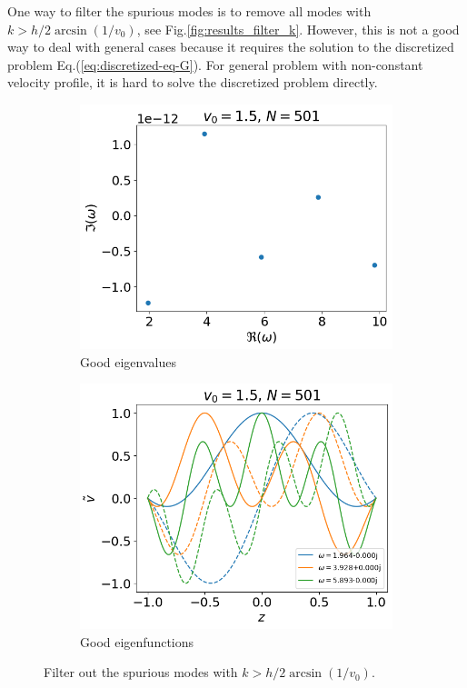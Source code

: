 One way to filter the spurious modes is to remove all modes with $k>h/2 \arcsin(1/v_0)$, see Fig.\ref{fig:results_filter_k}. However, this is not a good way to deal with general cases because it requires the solution to the discretized problem Eq.(\ref{eq:discretized-eq-G}). For general problem with non-constant velocity profile, it is hard to solve the discretized problem directly.

\begin{figure}[H]
	\centering
	\begin{subfigure}[b]{0.5\linewidth}
		\includegraphics[width=\linewidth]{img/theoretical-analysis/eigvals-good} 
		\caption{Good eigenvalues}
	\end{subfigure}%
	\begin{subfigure}[b]{0.5\linewidth}
		\includegraphics[width=\linewidth]{img/theoretical-analysis/eigvecs-good} 
		\caption{Good eigenfunctions}
	\end{subfigure}
	\caption{Filter out the spurious modes with $k>h/2\arcsin(1/v_0)$.}
	\label{fig:results-filter-k}
\end{figure}

